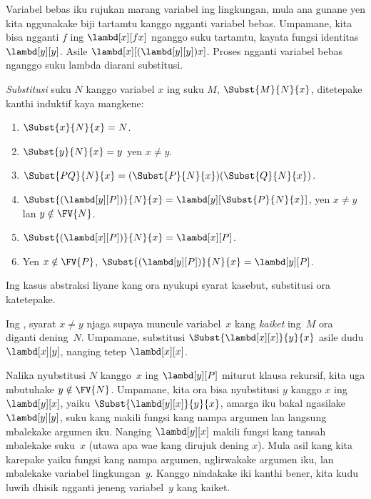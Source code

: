 \documentclass[../../../include/open-logic-section]{subfiles}
\begin{document}

\begin{explain}
Variabel bebas iku rujukan marang variabel
ing lingkungan, mula ana gunane yen kita
nggunakake biji tartamtu kanggo ngganti
variabel bebas. Umpamane, kita bisa
ngganti $f$ ing $\lambd[x][f x]$
nganggo suku tartamtu, kayata fungsi
identitas $\lambd[y][y]$. Asile
$\lambd[x][(\lambd[y][y]) x]$.
Proses ngganti variabel bebas nganggo
suku lambda diarani substitusi.
\end{explain}

\begin{defn}[Substitusi] 
  \emph{Substitusi} suku $N$ kanggo
  variabel $x$ ing suku $M$,
  $\Subst{M}{N}{x}$, ditetepake
  kanthi induktif kaya mangkene:
  \begin{enumerate}
    \item $\Subst{x}{N}{x} = N$.  
    \item $\Subst{y}{N}{x}  = y$ yen $x \neq y$.  
    \item $\Subst{PQ}{N}{x}  = (\Subst{P}{N}{x}) (\Subst{Q}{N}{x})$.
    \item $\Subst{(\lambd[y][P])}{N}{x} = \lambd[y][\Subst{P}{N}{x}]$,
      yen $x \neq y$ lan $y \notin \FV{N}$.
    \item $\Subst{(\lambd[x][P])}{N}{x} = \lambd[x][P]$.
    \item Yen $x \notin \FV{P}$,
      $\Subst{(\lambd[y][P])}{N}{x} = \lambd[y][P]$.
  \end{enumerate}
  Ing kasus abstraksi liyane kang ora nyukupi
  syarat kasebut, substitusi ora katetepake.
\end{defn}

\begin{explain}
Ing ,
syarat $x \neq y$ njaga supaya
muncule variabel~$x$ kang \emph{kaiket}
ing~$M$ ora diganti dening~$N$.
Umpamane, substitusi
$\Subst{\lambd[x][x]}{y}{x}$
asile dudu $\lambd[x][y]$,
nanging tetep $\lambd[x][x]$.

Nalika nyubstitusi $N$ kanggo~$x$ ing
$\lambd[y][P]$ miturut klausa rekursif, kita uga mbutuhake
$y \notin \FV{N}$. Umpamane,
kita ora bisa nyubstitusi $y$ kanggo $x$
ing $\lambd[y][x]$, yaiku
$\Subst{\lambd[y][x]}{y}{x}$,
amarga iku bakal ngasilake
$\lambd[y][y]$, suku kang makili
fungsi kang nampa argumen lan
langsung mbalekake argumen iku.
Nanging $\lambd[y][x]$ makili
fungsi kang tansah mbalekake suku~$x$
(utawa apa wae kang dirujuk dening $x$).
Mula asil kang kita karepake yaiku
fungsi kang nampa argumen,
nglirwakake argumen iku, lan
mbalekake variabel lingkungan~$y$.
Kanggo nindakake iki kanthi bener,
kita kudu luwih dhisik ngganti jeneng
variabel~$y$ kang kaiket.
\end{explain}
\end{document}
